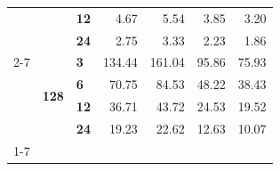 \begin{table}
\begin{tabular}{lll|rr|rr}
\textbf{} & \textbf{} & \textbf{12} & 4.67 & 5.54 & 3.85 & 3.20 \\
\textbf{} & \textbf{} & \textbf{24} & 2.75 & 3.33 & 2.23 & 1.86 \\
\cline{2-7}
\textbf{} & \multirow[t]{4}{*}{\textbf{128}} & \textbf{3} & 134.44 & 161.04 & 95.86 & 75.93 \\
\textbf{} & \textbf{} & \textbf{6} & 70.75 & 84.53 & 48.22 & 38.43 \\
\textbf{} & \textbf{} & \textbf{12} & 36.71 & 43.72 & 24.53 & 19.52 \\
\textbf{} & \textbf{} & \textbf{24} & 19.23 & 22.62 & 12.63 & 10.07 \\
\cline{1-7} \cline{2-7}
\bottomrule
\end{tabular}
\end{table}
